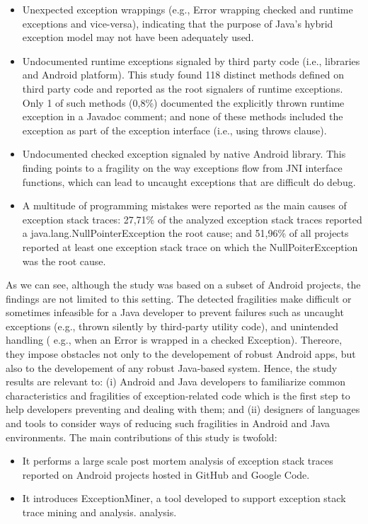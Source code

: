 \documentclass[conference]{IEEEtran}
\begin{document}
\begin{itemize}

   \item  Unexpected exception wrappings (e.g., Error wrapping checked and runtime
    exceptions and vice-versa), indicating that the purpose of Java's hybrid exception model may not have been adequately used.

   \item Undocumented runtime exceptions signaled by third party code (i.e., libraries and Android platform). 
This study found 118 distinct methods defined on third party code and  reported as the root signalers of 
runtime exceptions. Only 1 of such methods (0,8\%) documented the explicitly thrown runtime exception 
in a Javadoc comment; and none of these methods included the exception as part of the exception 
interface (i.e., using throws clause).

   \item Undocumented checked exception signaled by native Android library. This finding points to a fragility 
on the way exceptions flow from JNI interface functions, which can lead to uncaught exceptions that are difficult do 
debug. 

  \item  A multitude of programming mistakes were reported as the main causes of exception stack traces:
 27,71\% of the analyzed exception stack traces reported a java.lang.NullPointerException the root cause;
and  51,96\% of all projects reported at least one exception stack trace on which the NullPoiterException
was the root cause.

\end{itemize}

As we can see, although the study was based on a subset of Android projects, 
the findings are not limited to this setting. The detected fragilities make difficult
or sometimes infeasible for a Java developer to prevent failures such as 
uncaught exceptions (e.g., thrown silently by third-party utility code), and 
unintended handling ( e.g., when an Error is wrapped in a checked Exception).
Thereore, they impose obstacles not only to the developement of robust Android apps, 
but also to the developement of any robust Java-based system. 
Hence, the study results are relevant to: (i) Android and 
Java developers to familiarize common characteristics and fragilities of exception-related code 
which is the first step to help developers preventing and dealing with them; and (ii) designers of languages and tools 
to consider ways of reducing such fragilities in Android and Java environments.
The main contributions of this study is twofold:
\begin{itemize}

  \item  It performs a large scale post mortem analysis of exception stack traces reported on Android projects hosted in GitHub and Google Code.
  \item  It introduces ExceptionMiner, a tool developed to support exception stack trace mining and analysis.
    analysis.

\end{itemize}
\end{document}
